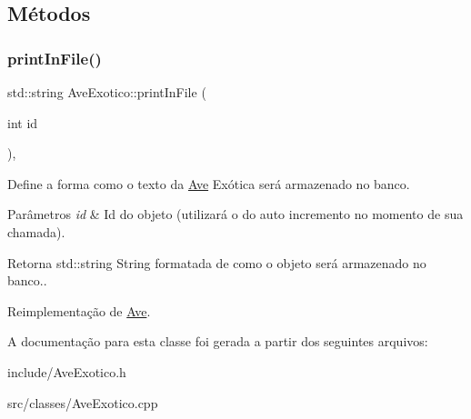 \subsection{Métodos}
\mbox{\label{classAveExotico_a4ba81def12131f047b3800e5f10a983b}} 
\subsubsection{\texorpdfstring{print\+In\+File()}{printInFile()}}
{\footnotesize\ttfamily std\+::string Ave\+Exotico\+::print\+In\+File (\begin{DoxyParamCaption}\item[{int}]{id }\end{DoxyParamCaption})\hspace{0.3cm}{\ttfamily [protected]}, {\ttfamily [virtual]}}



Define a forma como o texto da \hyperlink{classAve}{Ave} Exótica será armazenado no banco. 


\begin{DoxyParams}{Parâmetros}
{\em id} & Id do objeto (utilizará o do auto incremento no momento de sua chamada). \\
\hline
\end{DoxyParams}
\begin{DoxyReturn}{Retorna}
std\+::string String formatada de como o objeto será armazenado no banco.. 
\end{DoxyReturn}


Reimplementação de \hyperlink{classAve_a41d6ba4bf7e4823274211a9ae908ff1f}{Ave}.



A documentação para esta classe foi gerada a partir dos seguintes arquivos\+:\begin{DoxyCompactItemize}
\item 
include/Ave\+Exotico.\+h\item 
src/classes/Ave\+Exotico.\+cpp\end{DoxyCompactItemize}
